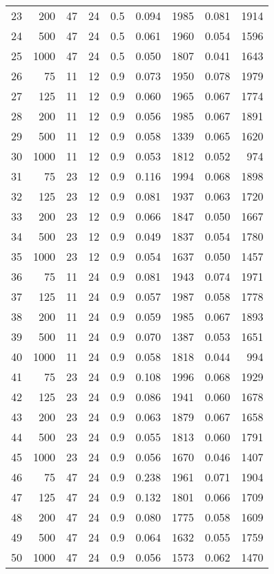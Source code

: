 \documentclass{article}
\begin{document}
\begin{table}[ht]
\begin{center}
\begin{tabular}{rrrrrrrrr}
  23 & 200 & 47 & 24 & 0.5 & 0.094 & 1985 & 0.081 & 1914 \\ 
  24 & 500 & 47 & 24 & 0.5 & 0.061 & 1960 & 0.054 & 1596 \\ 
  25 & 1000 & 47 & 24 & 0.5 & 0.050 & 1807 & 0.041 & 1643 \\ 
   \hline
26 & 75 & 11 & 12 & 0.9 & 0.073 & 1950 & 0.078 & 1979 \\ 
  27 & 125 & 11 & 12 & 0.9 & 0.060 & 1965 & 0.067 & 1774 \\ 
  28 & 200 & 11 & 12 & 0.9 & 0.056 & 1985 & 0.067 & 1891 \\ 
  29 & 500 & 11 & 12 & 0.9 & 0.058 & 1339 & 0.065 & 1620 \\ 
  30 & 1000 & 11 & 12 & 0.9 & 0.053 & 1812 & 0.052 & 974 \\ 
   \hline
31 & 75 & 23 & 12 & 0.9 & 0.116 & 1994 & 0.068 & 1898 \\ 
  32 & 125 & 23 & 12 & 0.9 & 0.081 & 1937 & 0.063 & 1720 \\ 
  33 & 200 & 23 & 12 & 0.9 & 0.066 & 1847 & 0.050 & 1667 \\ 
  34 & 500 & 23 & 12 & 0.9 & 0.049 & 1837 & 0.054 & 1780 \\ 
  35 & 1000 & 23 & 12 & 0.9 & 0.054 & 1637 & 0.050 & 1457 \\ 
   \hline
36 & 75 & 11 & 24 & 0.9 & 0.081 & 1943 & 0.074 & 1971 \\ 
  37 & 125 & 11 & 24 & 0.9 & 0.057 & 1987 & 0.058 & 1778 \\ 
  38 & 200 & 11 & 24 & 0.9 & 0.059 & 1985 & 0.067 & 1893 \\ 
  39 & 500 & 11 & 24 & 0.9 & 0.070 & 1387 & 0.053 & 1651 \\ 
  40 & 1000 & 11 & 24 & 0.9 & 0.058 & 1818 & 0.044 & 994 \\ 
   \hline
41 & 75 & 23 & 24 & 0.9 & 0.108 & 1996 & 0.068 & 1929 \\ 
  42 & 125 & 23 & 24 & 0.9 & 0.086 & 1941 & 0.060 & 1678 \\ 
  43 & 200 & 23 & 24 & 0.9 & 0.063 & 1879 & 0.067 & 1658 \\ 
  44 & 500 & 23 & 24 & 0.9 & 0.055 & 1813 & 0.060 & 1791 \\ 
  45 & 1000 & 23 & 24 & 0.9 & 0.056 & 1670 & 0.046 & 1407 \\ 
   \hline
46 & 75 & 47 & 24 & 0.9 & 0.238 & 1961 & 0.071 & 1904 \\ 
  47 & 125 & 47 & 24 & 0.9 & 0.132 & 1801 & 0.066 & 1709 \\ 
  48 & 200 & 47 & 24 & 0.9 & 0.080 & 1775 & 0.058 & 1609 \\ 
  49 & 500 & 47 & 24 & 0.9 & 0.064 & 1632 & 0.055 & 1759 \\ 
  50 & 1000 & 47 & 24 & 0.9 & 0.056 & 1573 & 0.062 & 1470 \\ 
   \hline
\end{tabular}
\end{center}
\end{table}
\end{document}

